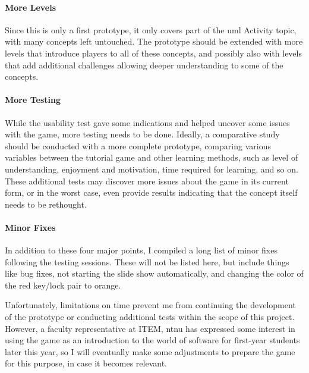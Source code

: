 \paragraph{More Levels} Since this is only a first prototype, it only covers part of the \gls{uml} Activity topic, with many concepts left untouched. The prototype should be extended with more levels that introduce players to all of these concepts, and possibly also with levels that add additional challenges allowing deeper understanding to some of the concepts.

\paragraph{More Testing} While the usability test gave some indications and helped uncover some issues with the game, more testing needs to be done. Ideally, a comparative study should be conducted with a more complete prototype, comparing various variables between the tutorial game and other learning methods, such as level of understanding, enjoyment and motivation, time required for learning, and so on. These additional tests may discover more issues about the game in its current form, or in the worst case, even provide results indicating that the concept itself needs to be rethought.

\paragraph{Minor Fixes} In addition to these four major points, I compiled a long list of minor fixes following the testing sessions. These will not be listed here, but include things like bug fixes, not starting the slide show automatically, and changing the color of the red key/lock pair to orange.

\noindent
Unfortunately, limitations on time prevent me from continuing the development of the prototype or conducting additional tests within the scope of this project. However, a faculty representative at ITEM, \gls{ntnu} has expressed some interest in using the game as an introduction to the world of software for first-year students later this year, so I will eventually make some adjustments to prepare the game for this purpose, in case it becomes relevant.
